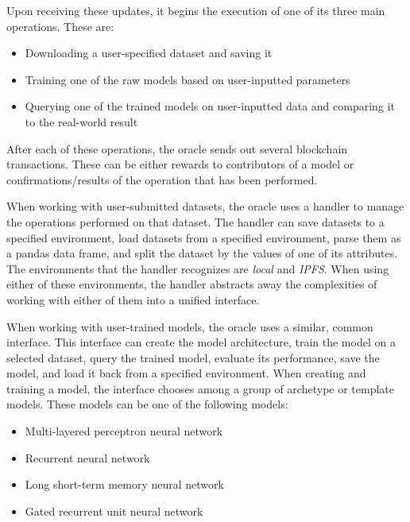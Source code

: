 \documentclass{ledger}
\begin{document}
Upon receiving these updates, it begins the execution of one of its three main operations.  These are:

\begin{itemize}
    \item Downloading a user-specified dataset and saving it
    \item Training one of the raw models based on user-inputted parameters
    \item Querying one of the trained models on user-inputted data and comparing it to the real-world result
\end{itemize}

After each of these operations, the oracle sends out several blockchain transactions.  These can be either rewards to contributors of a model or confirmations/results of the operation that has been performed.

When working with user-submitted datasets, the oracle uses a handler to manage the operations performed on that dataset. The handler can save datasets to a specified environment, load datasets from a specified environment, parse them as a pandas data frame, and split the dataset by the values of one of its attributes.  The environments that the handler recognizes are \textit{local} and \textit{IPFS}.  When using either of these environments, the handler abstracts away the complexities of working with either of them into a unified interface.

When working with user-trained models, the oracle uses a similar, common interface.  This interface can create the model architecture, train the model on a selected dataset, query the trained model, evaluate its performance, save the model, and load it back from a specified environment.  When creating and training a model, the interface chooses among a group of archetype or template models.  These models can be one of the following models:

\begin{itemize}
    \item Multi-layered perceptron neural network~\cite{preceptrons}
    \item Recurrent neural network~\cite{RNN}
    \item Long short-term memory neural network~\cite{LSTM}
    \item Gated recurrent unit neural network~\cite{GRU}
\end{itemize}
\end{document}
